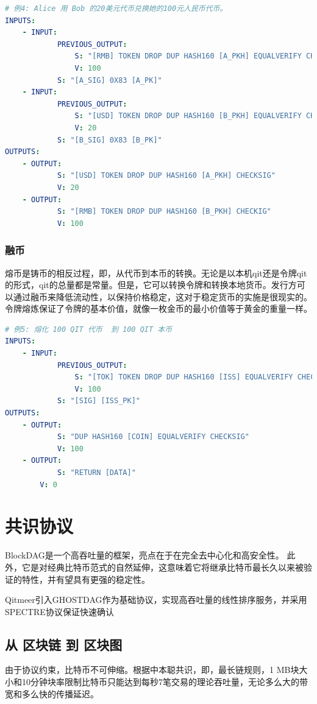 \documentclass[a4paper,11pt]{article}
\begin{document}
\lstset{basicstyle=\tiny,style=myListStyle}
\begin{lstlisting}[language=yaml, numbers=none,basicstyle=\footnotesize]
# 例4: Alice 用 Bob 的20美元代币兑换她的100元人民币代币。
INPUTS:
	- INPUT:
			PREVIOUS_OUTPUT:
				S: "[RMB] TOKEN DROP DUP HASH160 [A_PKH] EQUALVERIFY CHECKSIG"
				V: 100
			S: "[A_SIG] 0X83 [A_PK]"
	- INPUT:
			PREVIOUS_OUTPUT:
				S: "[USD] TOKEN DROP DUP HASH160 [B_PKH] EQUALVERIFY CHECKSIG"
				V: 20
			S: "[B_SIG] 0X83 [B_PK]"
OUTPUTS:
	- OUTPUT:
			S: "[USD] TOKEN DROP DUP HASH160 [A_PKH] CHECKSIG"
			V: 20
	- OUTPUT:
			S: "[RMB] TOKEN DROP DUP HASH160 [B_PKH] CHECKIG"
			V: 100
\end{lstlisting}


\subsubsection{融币}

熔币是铸币的相反过程，即，从代币到本币的转换。无论是以本机qit还是令牌qit的形式，qit的总量都是常量。但是，它可以转换令牌和转换本地货币。发行方可以通过融币来降低流动性，以保持价格稳定，这对于稳定货币的实施是很现实的。令牌熔炼保证了令牌的基本价值，就像一枚金币的最小价值等于黄金的重量一样。

\lstset{basicstyle=\tiny,style=myListStyle}
\begin{lstlisting}[language=yaml, numbers=none,basicstyle=\footnotesize]
# 例5: 熔化 100 QIT 代币  到 100 QIT 本币 
INPUTS:
	- INPUT:
			PREVIOUS_OUTPUT:
				S: "[TOK] TOKEN DROP DUP HASH160 [ISS] EQUALVERIFY CHECKSIG"
				V: 100
			S: "[SIG] [ISS_PK]"
OUTPUTS:
	- OUTPUT:
			S: "DUP HASH160 [COIN] EQUALVERIFY CHECKSIG"
			V: 100
	- OUTPUT:
			S: "RETURN [DATA]"
		V: 0
\end{lstlisting}


\section{共识协议}

BlockDAG是一个高吞吐量的框架，亮点在于在完全去中心化和高安全性。
此外，它是对经典比特币范式的自然延伸，这意味着它将继承比特币最长久以来被验证的特性，并有望具有更强的稳定性。

Qitmeer引入GHOSTDAG作为基础协议，实现高吞吐量的线性排序服务，并采用SPECTRE协议保证快速确认

\subsection{从 区块链 到 区块图}
由于协议约束，比特币不可伸缩。根据中本聪共识，即，最长链规则，1 MB块大小和10分钟块率限制比特币只能达到每秒7笔交易的理论吞吐量，无论多么大的带宽和多么快的传播延迟。
\end{document}
